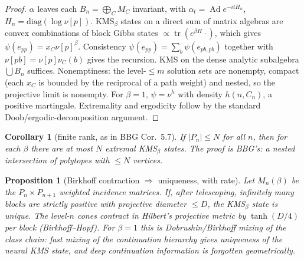\documentclass[11pt]{article}
\newtheorem{proposition}[theorem]{Proposition}
\newtheorem{corollary}[theorem]{Corollary}
\theoremstyle{definition}
\theoremstyle{remark}
\newcommand{\tr}{\operatorname{tr}}
\newcommand{\Ad}{\operatorname{Ad}}
\begin{document}
\begin{proof}
$\alpha$ leaves each $B_n=\bigoplus_CM_C$ invariant, with $\alpha_t=\Ad e^{-itH_n}$, $H_n=\mathrm{diag}(\log\nu[p])$. KMS$_\beta$ states on a direct sum of matrix algebras are convex combinations of block Gibbs states $\propto\tr(e^{\beta H}\cdot)$, which gives $\psi(e_{pp})=x_C\nu[p]^\beta$. Consistency $\psi(e_{pp})=\sum_b\psi(e_{pb,pb})$ together with $\nu[pb]=\nu[p]\nu_C(b)$ gives the recursion. KMS on the dense analytic subalgebra $\bigcup B_n$ suffices. Nonemptiness: the level-$\le m$ solution sets are nonempty, compact (each $x_C$ is bounded by the reciprocal of a path weight) and nested, so the projective limit is nonempty. For $\beta=1$, $\psi=\nu^h$ with density $h(n,C_n)$, a positive martingale. Extremality and ergodicity follow by the standard Doob/ergodic-decomposition argument.
\end{proof}

\begin{corollary}[finite rank, as in BBG Cor.~5.7]
If $|P_n|\le N$ for all $n$, then for each $\beta$ there are at most $N$ extremal KMS$_\beta$ states. The proof is BBG's: a nested intersection of polytopes with $\le N$ vertices.
\end{corollary}

\begin{proposition}[Birkhoff contraction $\Rightarrow$ uniqueness, with rate]\label{prop:birkhoff}
Let $M_n(\beta)$ be the $P_n\times P_{n+1}$ weighted incidence matrices. If, after telescoping, infinitely many blocks are strictly positive with projective diameter $\le D$, the KMS$_\beta$ state is unique. The level-$n$ cones contract in Hilbert's projective metric by $\tanh(D/4)$ per block (Birkhoff--Hopf). For $\beta=1$ this is Dobrushin/Birkhoff mixing of the class chain: \emph{fast mixing of the continuation hierarchy gives uniqueness of the neural KMS state, and deep continuation information is forgotten geometrically.}
\end{proposition}
\end{document}
